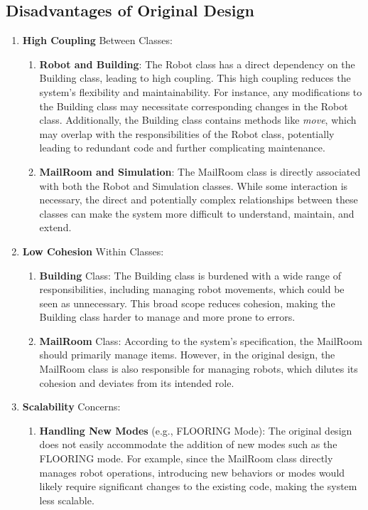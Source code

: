 \documentclass[12pt]{article}
\begin{document}
\subsection{Disadvantages of Original Design}
\begin{enumerate}
    \item \textbf{High Coupling }Between Classes:
    \begin{enumerate}
        \item \textbf{Robot and Building}: The Robot class has a direct dependency on the Building class, leading to high coupling. This high coupling reduces the system's flexibility and maintainability. For instance, any modifications to the Building class may necessitate corresponding changes in the Robot class. Additionally, the Building class contains methods like \textit{move}, which may overlap with the responsibilities of the Robot class, potentially leading to redundant code and further complicating maintenance.
        \item \textbf{MailRoom and Simulation}: The MailRoom class is directly associated with both the Robot and Simulation classes. While some interaction is necessary, the direct and potentially complex relationships between these classes can make the system more difficult to understand, maintain, and extend.
    \end{enumerate}
    \item \textbf{Low Cohesion} Within Classes:
    \begin{enumerate}
        \item \textbf{Building} Class: The Building class is burdened with a wide range of responsibilities, including managing robot movements, which could be seen as unnecessary. This broad scope reduces cohesion, making the Building class harder to manage and more prone to errors.
        \item \textbf{MailRoom} Class: According to the system's specification, the MailRoom should primarily manage items. However, in the original design, the MailRoom class is also responsible for managing robots, which dilutes its cohesion and deviates from its intended role.
    \end{enumerate}
    \item \textbf{Scalability} Concerns:
    \begin{enumerate}
        \item \textbf{Handling New Modes} (e.g., FLOORING Mode): The original design does not easily accommodate the addition of new modes such as the FLOORING mode. For example, since the MailRoom class directly manages robot operations, introducing new behaviors or modes would likely require significant changes to the existing code, making the system less scalable.

\end{enumerate}
\end{enumerate}
\end{document}
